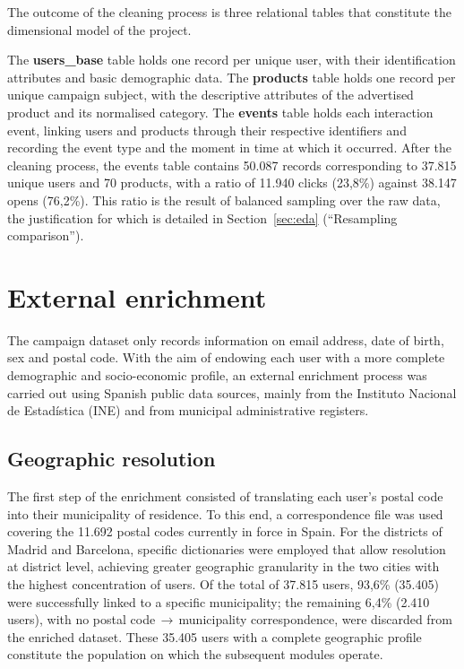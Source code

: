 The outcome of the cleaning process is three relational tables that constitute the dimensional model of the project.

The \textbf{users\_base} table holds one record per unique user, with their identification attributes and basic demographic data. The \textbf{products} table holds one record per unique campaign subject, with the descriptive attributes of the advertised product and its normalised category. The \textbf{events} table holds each interaction event, linking users and products through their respective identifiers and recording the event type and the moment in time at which it occurred. After the cleaning process, the events table contains 50.087 records corresponding to 37.815 unique users and 70 products, with a ratio of 11.940 clicks (23,8\%) against 38.147 opens (76,2\%). This ratio is the result of balanced sampling over the raw data, the justification for which is detailed in Section~\ref{sec:eda} (``Resampling comparison'').

\section{External enrichment}

The campaign dataset only records information on email address, date of birth, sex and postal code. With the aim of endowing each user with a more complete demographic and socio-economic profile, an external enrichment process was carried out using Spanish public data sources, mainly from the Instituto Nacional de Estadística (INE) and from municipal administrative registers.

\subsection{Geographic resolution}

The first step of the enrichment consisted of translating each user's postal code into their municipality of residence. To this end, a correspondence file was used covering the 11.692 postal codes currently in force in Spain. For the districts of Madrid and Barcelona, specific dictionaries were employed that allow resolution at district level, achieving greater geographic granularity in the two cities with the highest concentration of users. Of the total of 37.815 users, 93,6\% (35.405) were successfully linked to a specific municipality; the remaining 6,4\% (2.410 users), with no postal code\,$\rightarrow$\,municipality correspondence, were discarded from the enriched dataset. These 35.405 users with a complete geographic profile constitute the population on which the subsequent modules operate.

